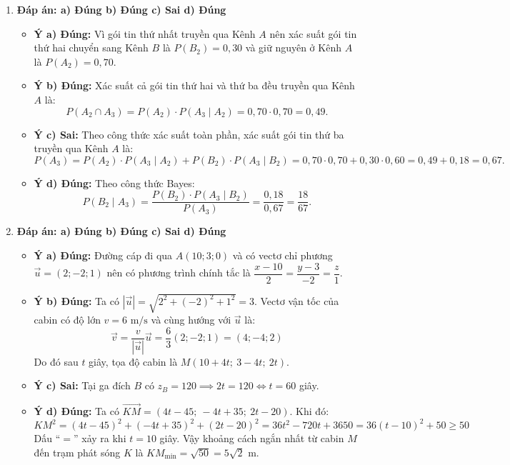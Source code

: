 \documentclass[12pt,a4paper]{article}
\begin{document}
\begin{enumerate}[label=\textbf{Câu \arabic*:}, leftmargin=*]
\item \textbf{Đáp án: a) Đúng \quad b) Đúng \quad c) Sai \quad d) Đúng}
\begin{itemize}
    \item \textbf{Ý a) Đúng:} Vì gói tin thứ nhất truyền qua Kênh $A$ nên xác suất gói tin thứ hai chuyển sang Kênh $B$ là $P(B_2) = 0{,}30$ và giữ nguyên ở Kênh $A$ là $P(A_2) = 0{,}70$.
    \item \textbf{Ý b) Đúng:} Xác suất cả gói tin thứ hai và thứ ba đều truyền qua Kênh $A$ là:
    $$P(A_2 \cap A_3) = P(A_2)\cdot P(A_3 \mid A_2) = 0{,}70 \cdot 0{,}70 = 0{,}49.$$
    \item \textbf{Ý c) Sai:} Theo công thức xác suất toàn phần, xác suất gói tin thứ ba truyền qua Kênh $A$ là:
    $$P(A_3) = P(A_2)\cdot P(A_3 \mid A_2) + P(B_2)\cdot P(A_3 \mid B_2) = 0{,}70\cdot 0{,}70 + 0{,}30\cdot 0{,}60 = 0{,}49 + 0{,}18 = 0{,}67.$$
    \item \textbf{Ý d) Đúng:} Theo công thức Bayes:
    $$P(B_2 \mid A_3) = \dfrac{P(B_2)\cdot P(A_3 \mid B_2)}{P(A_3)} = \dfrac{0{,}18}{0{,}67} = \dfrac{18}{67}.$$
\end{itemize}

\item \textbf{Đáp án: a) Đúng \quad b) Đúng \quad c) Sai \quad d) Đúng}
\begin{itemize}
    \item \textbf{Ý a) Đúng:} Đường cáp đi qua $A(10; 3; 0)$ và có vectơ chỉ phương $\vec{u} = (2; -2; 1)$ nên có phương trình chính tắc là $\dfrac{x - 10}{2} = \dfrac{y - 3}{-2} = \dfrac{z}{1}$.
    \item \textbf{Ý b) Đúng:} Ta có $|\vec{u}| = \sqrt{2^2 + (-2)^2 + 1^2} = 3$. Vectơ vận tốc của cabin có độ lớn $v = 6\text{ m/s}$ và cùng hướng với $\vec{u}$ là:
    $$\vec{v} = \dfrac{v}{|\vec{u}|}\vec{u} = \dfrac{6}{3}(2; -2; 1) = (4; -4; 2)$$
    Do đó sau $t$ giây, tọa độ cabin là $M(10 + 4t;\ 3 - 4t;\ 2t)$.
    \item \textbf{Ý c) Sai:} Tại ga đích $B$ có $z_B = 120 \implies 2t = 120 \iff t = 60$ giây.
    \item \textbf{Ý d) Đúng:} Ta có $\overrightarrow{KM} = (4t - 45;\ -4t + 35;\ 2t - 20)$. Khi đó:
    $$KM^2 = (4t - 45)^2 + (-4t + 35)^2 + (2t - 20)^2 = 36t^2 - 720t + 3650 = 36(t - 10)^2 + 50 \ge 50$$
    Dấu ``$=$'' xảy ra khi $t = 10$ giây. Vậy khoảng cách ngắn nhất từ cabin $M$ đến trạm phát sóng $K$ là $KM_{\min} = \sqrt{50} = 5\sqrt{2}\text{ m}$.
\end{itemize}

\end{enumerate}
\end{document}
